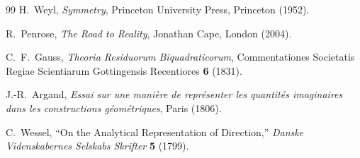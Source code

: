 \documentclass[12pt]{article}
\begin{document}
\begin{thebibliography}{99}
H.\ Weyl,
\textit{Symmetry},
Princeton University Press, Princeton (1952).

R.\ Penrose,
\textit{The Road to Reality},
Jonathan Cape, London (2004).

C.\ F.\ Gauss,
\textit{Theoria Residuorum Biquadraticorum},
Commentationes Societatis Regiae Scientiarum Gottingensis Recentiores
\textbf{6} (1831).

J.-R.\ Argand,
\textit{Essai sur une mani\`{e}re de repr\'{e}senter les quantit\'{e}s
imaginaires dans les constructions g\'{e}om\'{e}triques},
Paris (1806).

C.\ Wessel,
``On the Analytical Representation of Direction,''
\textit{Danske Videnskabernes Selskabs Skrifter} \textbf{5} (1799).

\end{thebibliography}
\end{document}
